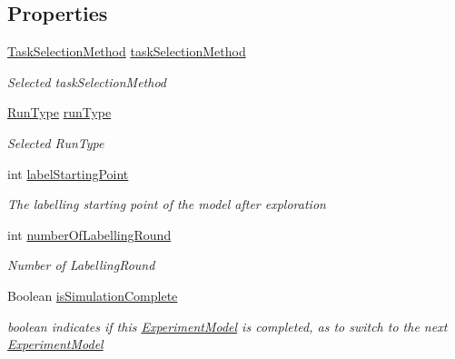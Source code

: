 \subsection*{Properties}
\begin{DoxyCompactItemize}
\item 
\hyperlink{namespace_crowdsourcing_models_a1bb21d66b6c86daa36af97d919528356}{Task\+Selection\+Method} \hyperlink{class_acrive_crowd_g_u_i_1_1_experiment_model_adc798915e34d2b0cf58e527db9372300}{task\+Selection\+Method}
\begin{DoxyCompactList}\small\item\em Selected task\+Selection\+Method \end{DoxyCompactList}\item 
\hyperlink{namespace_crowdsourcing_models_ae187d0e1d9fe64e7ebcb9d948d02d2d0}{Run\+Type} \hyperlink{class_acrive_crowd_g_u_i_1_1_experiment_model_a1f9de8a43c8836d01bb6a0d643677627}{run\+Type}
\begin{DoxyCompactList}\small\item\em Selected Run\+Type \end{DoxyCompactList}\item 
int \hyperlink{class_acrive_crowd_g_u_i_1_1_experiment_model_a3aa0a6773b8ecfb0aca8bb08e57b02ed}{label\+Starting\+Point}
\begin{DoxyCompactList}\small\item\em The labelling starting point of the model after exploration \end{DoxyCompactList}\item 
int \hyperlink{class_acrive_crowd_g_u_i_1_1_experiment_model_ad35017c811ab03b6a31d7cd467badcef}{number\+Of\+Labelling\+Round}
\begin{DoxyCompactList}\small\item\em Number of Labelling\+Round \end{DoxyCompactList}\item 
Boolean \hyperlink{class_acrive_crowd_g_u_i_1_1_experiment_model_a9ccc83d4f9434cb406a144214821cf2c}{is\+Simulation\+Complete}
\begin{DoxyCompactList}\small\item\em boolean indicates if this \hyperlink{class_acrive_crowd_g_u_i_1_1_experiment_model}{Experiment\+Model} is completed, as to switch to the next \hyperlink{class_acrive_crowd_g_u_i_1_1_experiment_model}{Experiment\+Model} \end{DoxyCompactList}\item 

\end{DoxyCompactItemize}
